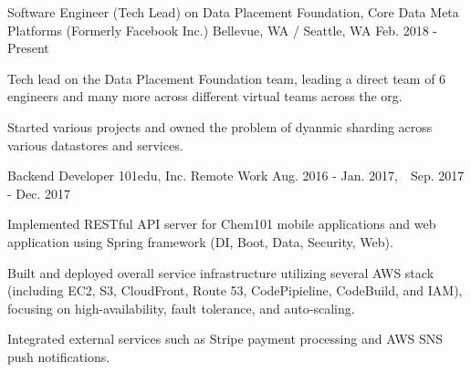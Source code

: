 

\begin{cventries}

\cventry
{Software Engineer (Tech Lead) on Data Placement Foundation, Core Data} %
{Meta Platforms (Formerly Facebook Inc.)} %
{Bellevue, WA / Seattle, WA} %
{Feb. 2018 - Present} %
{
	\begin{cvitems} %
		\item Tech lead on the Data Placement Foundation team, leading a direct team of 6 engineers and many more across different virtual teams across the org.
		\item Started various projects and owned the problem of dyanmic sharding across various datastores and services.
	\end{cvitems}
}

\cventry
{Backend Developer} %
{101edu, Inc.} %
{Remote Work} %
{Aug. 2016 - Jan. 2017,\ \ Sep. 2017 - Dec. 2017} %
{
	\begin{cvitems} %
		\item Implemented RESTful API server for Chem101 mobile applications and web application using Spring framework (DI, Boot, Data, Security, Web).
		\item Built and deployed overall service infrastructure utilizing several AWS stack (including EC2, S3, CloudFront, Route 53, CodePipieline, CodeBuild, and IAM), focusing on high-availability, fault tolerance, and auto-scaling.
		\item Integrated external services such as Stripe payment processing and AWS SNS push notifications.
	\end{cvitems}
}


\end{cventries}
